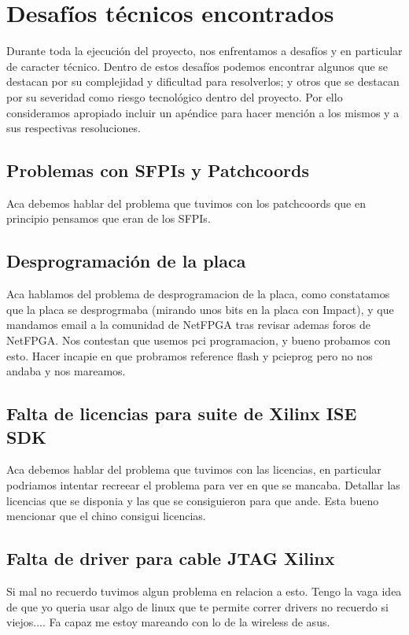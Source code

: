 
\chapter{Desaf\'ios t\'ecnicos encontrados}

Durante toda la ejecuci\'on del proyecto, nos enfrentamos a desaf\'ios y en particular de caracter t\'ecnico. Dentro de estos desaf\'ios podemos encontrar algunos que se destacan por su complejidad y dificultad para resolverlos; y otros que se destacan por su severidad como riesgo tecnol\'ogico dentro del proyecto. Por ello consideramos apropiado incluir un ap\'endice para hacer menci\'on a los mismos y a sus respectivas resoluciones.

\section{Problemas con SFPIs y Patchcoords}

Aca debemos hablar del problema que tuvimos con los patchcoords que en principio pensamos que eran de los SFPIs.

\section{Desprogramaci\'on de la placa}
Aca hablamos del problema de desprogramacion de la placa, como constatamos que la placa se desprogrmaba (mirando unos bits en la placa con Impact), y que mandamos email a la comunidad de NetFPGA tras revisar  ademas foros de NetFPGA. Nos contestan que usemos pci programacion, y bueno probamos con esto. Hacer incapie en que probramos reference flash y pcieprog pero no nos andaba y nos mareamos.

\section{Falta de licencias para suite de Xilinx ISE SDK}

Aca debemos hablar del problema que tuvimos con las licencias, en particular podriamos intentar recreear el problema para ver en que se mancaba. Detallar las licencias que se disponia y las que se consiguieron para que ande.
Esta bueno mencionar que el chino consigui licencias.

\section{Falta de driver para cable JTAG Xilinx}
Si mal no recuerdo tuvimos algun problema en relacion a esto. Tengo la vaga idea de que yo queria usar algo de linux que te permite correr drivers no recuerdo si viejos.... Fa capaz me estoy mareando con lo de la wireless de asus.


